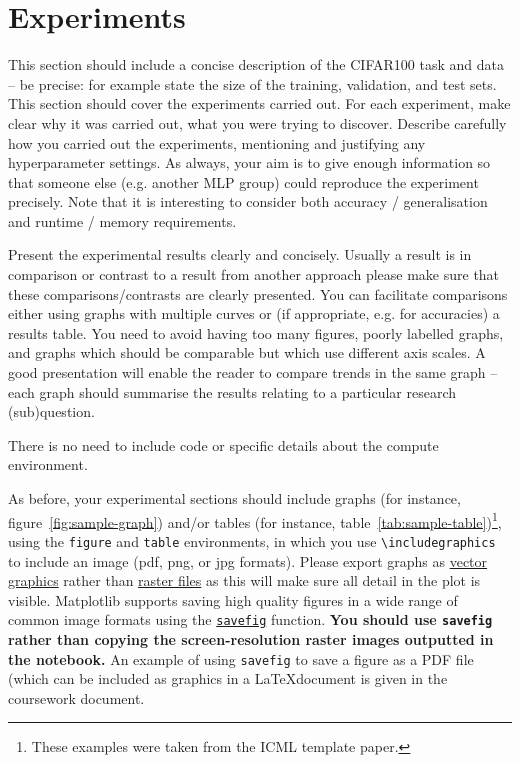 \documentclass{article}
\begin{document}
\section{Experiments}
This section should include a concise description of the CIFAR100 task and  data -- be precise: for example state the size of the training, validation, and test sets.  
This section should cover the experiments carried out. For each experiment, make clear why it was carried out, what you were trying to discover. Describe carefully how you carried out the experiments, mentioning and justifying any hyperparameter settings.  As always, your aim is to give enough information so that someone else (e.g. another MLP group) could reproduce the experiment precisely.  Note that it is interesting to consider both accuracy / generalisation and runtime / memory requirements.

Present the experimental results clearly and concisely.  Usually a result is in comparison or contrast to a result from another approach please make sure that these comparisons/contrasts are clearly presented.  You can facilitate comparisons either using graphs with multiple curves or (if appropriate, e.g. for accuracies) a results table. You need to avoid having too many figures, poorly labelled graphs, and graphs which should be comparable but which use different axis scales. A good presentation will enable the reader to compare trends in the same graph -- each graph should summarise the results relating to a particular research (sub)question.

There is no need to include code or specific details about the compute environment.

As before, your experimental sections should include graphs (for instance, figure~\ref{fig:sample-graph}) and/or tables (for instance, table~\ref{tab:sample-table})\footnote{These examples were taken from the ICML template paper.}, using the \verb+figure+ and \verb+table+ environments, in which you use \verb+\includegraphics+ to include an image (pdf, png, or jpg formats).  Please export graphs as 
\href{https://en.wikipedia.org/wiki/Vector_graphics}{vector graphics}
rather than \href{https://en.wikipedia.org/wiki/Raster_graphics}{raster
files} as this will make sure all detail in the plot is visible.
Matplotlib supports saving high quality figures in a wide range of
common image formats using the
\href{http://matplotlib.org/api/pyplot_api.html\#matplotlib.pyplot.savefig}{\texttt{savefig}}
function. \textbf{You should use \texttt{savefig} rather than copying
the screen-resolution raster images outputted in the notebook.} An
example of using \texttt{savefig} to save a figure as a PDF file (which
can be included as graphics in a \LaTeX document is given in the coursework document.
\end{document}
